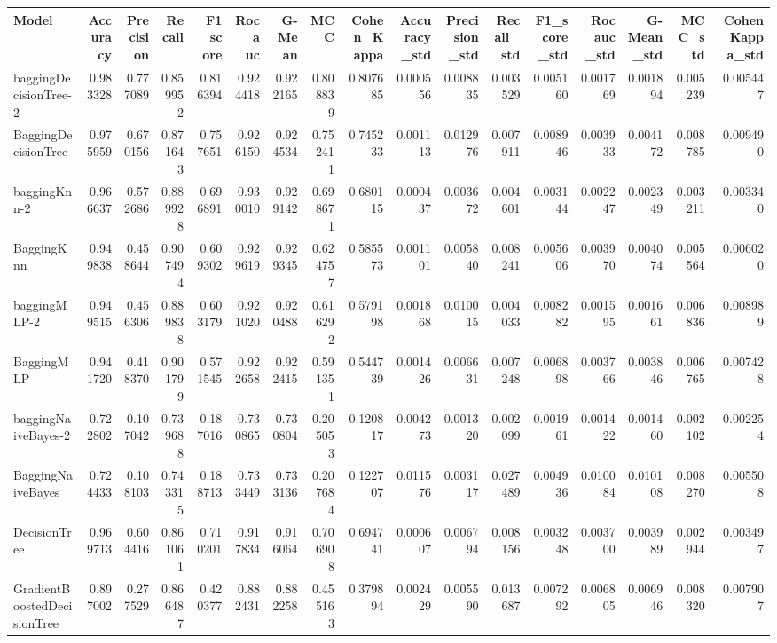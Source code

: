 \begin{tabular}{lrrrrrrrrrrrrrrrr}
\toprule
Model & Accuracy & Precision & Recall & F1_score & Roc_auc & G-Mean & MCC & Cohen_Kappa & Accuracy_std & Precision_std & Recall_std & F1_score_std & Roc_auc_std & G-Mean_std & MCC_std & Cohen_Kappa_std \\
\midrule
baggingDecisionTree-2 & 0.983328 & 0.777089 & 0.859952 & 0.816394 & 0.924418 & 0.922165 & 0.808839 & 0.807685 & 0.000556 & 0.008835 & 0.003529 & 0.005160 & 0.001769 & 0.001894 & 0.005239 & 0.005447 \\
BaggingDecisionTree & 0.975959 & 0.670156 & 0.871643 & 0.757651 & 0.926150 & 0.924534 & 0.752411 & 0.745233 & 0.001113 & 0.012976 & 0.007911 & 0.008946 & 0.003933 & 0.004172 & 0.008785 & 0.009490 \\
baggingKnn-2 & 0.966637 & 0.572686 & 0.889928 & 0.696891 & 0.930010 & 0.929142 & 0.698671 & 0.680115 & 0.000437 & 0.003672 & 0.004601 & 0.003144 & 0.002247 & 0.002349 & 0.003211 & 0.003340 \\
BaggingKnn & 0.949838 & 0.458644 & 0.907494 & 0.609302 & 0.929619 & 0.929345 & 0.624757 & 0.585573 & 0.001101 & 0.005840 & 0.008241 & 0.005606 & 0.003970 & 0.004074 & 0.005564 & 0.006020 \\
baggingMLP-2 & 0.949515 & 0.456306 & 0.889838 & 0.603179 & 0.921020 & 0.920488 & 0.616292 & 0.579198 & 0.001868 & 0.010015 & 0.004033 & 0.008282 & 0.001595 & 0.001661 & 0.006836 & 0.008989 \\
BaggingMLP & 0.941720 & 0.418370 & 0.901799 & 0.571545 & 0.922658 & 0.922415 & 0.591351 & 0.544739 & 0.001426 & 0.006631 & 0.007248 & 0.006898 & 0.003766 & 0.003846 & 0.006765 & 0.007428 \\
baggingNaiveBayes-2 & 0.722802 & 0.107042 & 0.739688 & 0.187016 & 0.730865 & 0.730804 & 0.205053 & 0.120817 & 0.004273 & 0.001320 & 0.002099 & 0.001961 & 0.001422 & 0.001460 & 0.002102 & 0.002254 \\
BaggingNaiveBayes & 0.724433 & 0.108103 & 0.743315 & 0.188713 & 0.733449 & 0.733136 & 0.207684 & 0.122707 & 0.011576 & 0.003117 & 0.027489 & 0.004936 & 0.010084 & 0.010108 & 0.008270 & 0.005508 \\
DecisionTree & 0.969713 & 0.604416 & 0.861061 & 0.710201 & 0.917834 & 0.916064 & 0.706908 & 0.694741 & 0.000607 & 0.006794 & 0.008156 & 0.003248 & 0.003700 & 0.003989 & 0.002944 & 0.003497 \\
GradientBoostedDecisionTree & 0.897002 & 0.277529 & 0.866487 & 0.420377 & 0.882431 & 0.882258 & 0.455163 & 0.379894 & 0.002429 & 0.005590 & 0.013687 & 0.007292 & 0.006805 & 0.006946 & 0.008320 & 0.007907 \\

\end{tabular}
